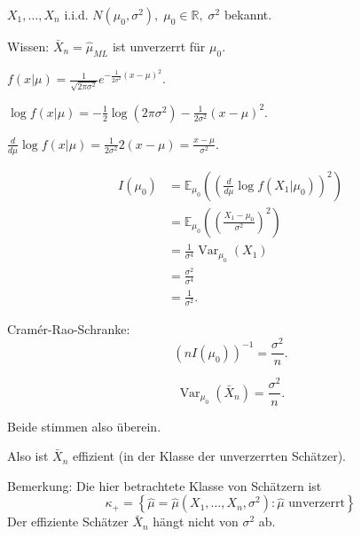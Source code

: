 \documentclass{tstextbook}
\DeclareMathOperator{\Var}{Var}
\newcommand{\E}{\mathbb E}
\newcommand{\R}{\mathbb R}
\begin{document}
\begin{example}
	$ X_1,\ldots,X_n $ i.i.d. $ N(\mu_0,\sigma^2), \; \mu_0 \in \R,\; \sigma^2 $ bekannt.
	
	Wissen: $ \bar{X}_n = \hat{\mu}_{ML} $ ist unverzerrt für $ \mu_0 $. 
	
	$ f(x|\mu) = \frac{1}{\sqrt{2\pi\sigma^2}} e^{-\frac{1}{2\sigma^2}(x-\mu)^2} $. 
	
	$ \log f(x|\mu) = -\frac{1}{2}\log(2\pi\sigma^2)-\frac{1}{2\sigma^2}(x-\mu)^2 $. 
	
	$ \frac{d}{d\mu}\log f(x|\mu) = \frac{1}{2\sigma^2}2(x-\mu) = \frac{x-\mu}{\sigma^2} $.
	
	\[
	\begin{aligned}
		I(\mu_0) & = \E_{\mu_0} \left(\left(\frac{d}{d\mu}\log f(X_1|\mu_0)\right)^2\right) \\
		& = \E_{\mu_0}\left(\left(\frac{X_1-\mu_0}{\sigma^2}\right)^2\right) \\
		& = \frac{1}{\sigma^4}\Var_{\mu_0}(X_1) \\
		& = \frac{\sigma^2}{\sigma^4} \\
		& = \frac{1}{\sigma^2}. 
	\end{aligned}
	\]
	
	Cramér-Rao-Schranke:
	\[
	(nI(\mu_0))^{-1} = \frac{\sigma^2}{n}.
	\]
	
	\[ \Var_{\mu_0}(\bar{X}_n) = \frac{\sigma^2}{n} . 
	\]
	
	Beide stimmen also überein. 
	
	Also ist $ \bar{X}_n $ effizient (in der Klasse der unverzerrten Schätzer).
\end{example}

\begin{remark}
	Bemerkung:
	Die hier betrachtete Klasse von Schätzern ist 
	\[
	\kappa_+ = \left\lbrace \hat{\mu} = \hat{\mu}(X_1,\ldots,X_n, \sigma^2) \colon \hat{\mu} \text{ unverzerrt}\right\rbrace
	\]
	Der effiziente Schätzer $ \bar{X}_n $ hängt nicht von $ \sigma^2 $ ab.
\end{remark}
\end{document}

